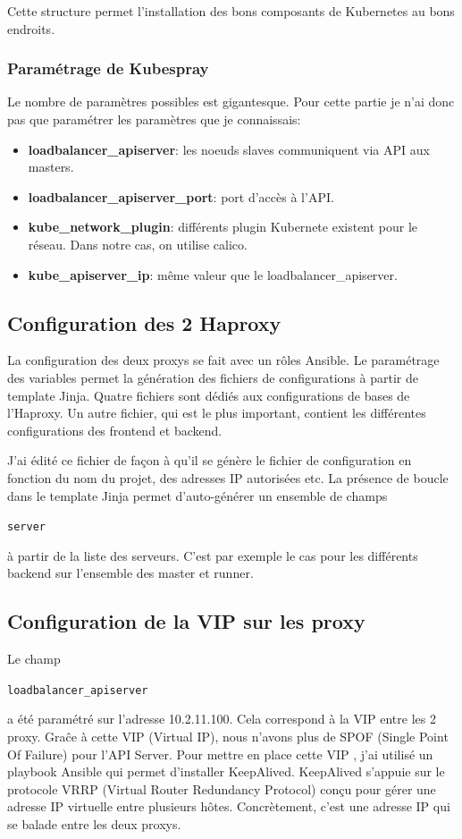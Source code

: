 \documentclass[12pt]{article}
\begin{document}
Cette structure permet l'installation des bons composants de \gls{Kubernetes} au bons endroits.

\subsubsection{Paramétrage de Kubespray}
Le nombre de paramètres possibles est gigantesque.
Pour cette partie je n'ai donc pas que paramétrer les paramètres que je connaissais:
\begin{itemize}
    \item \textbf{loadbalancer\_apiserver}: les noeuds slaves communiquent via \gls{API} aux masters.
    \item \textbf{loadbalancer\_apiserver\_port}: port d'accès à l'\gls{API}.
    \item \textbf{kube\_network\_plugin}: différents plugin Kubernete existent pour le réseau.
    Dans notre cas, on utilise calico.
    \item \textbf{kube\_apiserver\_ip}: même valeur que le loadbalancer\_apiserver.
\end{itemize}

\subsection{Configuration des 2 Haproxy}
La configuration des deux proxys se fait avec un rôles \gls{Ansible}.
Le paramétrage des variables permet la génération des fichiers de configurations à partir de template \gls{Jinja}.
Quatre fichiers sont dédiés aux configurations de bases de l'Haproxy.
Un autre fichier, qui est le plus important, contient les différentes configurations des frontend et backend.

J'ai édité ce fichier de façon à qu'il se génère le fichier de configuration en fonction du nom du projet, des adresses \gls{IP} autorisées etc.
La présence de boucle dans le template \gls{Jinja} permet d'auto-générer un ensemble de champs \begin{code}\texttt{server}\end{code} à partir de la liste des serveurs.
C'est par exemple le cas pour les différents backend sur l'ensemble des master et runner.

\subsection{Configuration de la VIP sur les proxy}
Le champ \begin{code}\texttt{loadbalancer\_apiserver}\end{code} a été paramétré sur l'adresse 10.2.11.100.
Cela correspond à la \gls{VIP} entre les 2 proxy.
Graĉe à cette \gls{VIP}  (Virtual \gls{IP}), nous n'avons plus de SPOF (Single Point Of Failure) pour l'\gls{API} Server.
Pour mettre en place cette \gls{VIP} , j'ai utilisé un playbook \gls{Ansible} qui permet d'installer KeepAlived.
KeepAlived s'appuie sur le protocole VRRP (Virtual Router Redundancy Protocol) conçu pour gérer une adresse \gls{IP} virtuelle entre plusieurs hôtes.
Concrètement, c'est une adresse \gls{IP} qui se balade entre les deux proxys.
\end{document}
